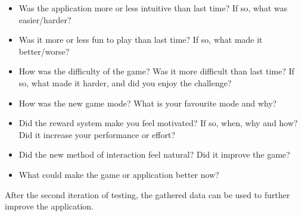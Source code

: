 \begin{itemize}
	\item Was the application more or less intuitive than last time? If so, what was easier/harder?
	\item Was it more or less fun to play than last time? If so, what made it better/worse?
	\item How was the difficulty of the game? Was it more difficult than last time? If so, what made it harder, and did you enjoy the challenge?
	\item How was the new game mode? What is your favourite mode and why?
	\item Did the reward system make you feel motivated? If so, when, why and how? Did it increase your performance or effort?
	\item Did the new method of interaction feel natural? Did it improve the game?
	\item What could make the game or application better now?
\end{itemize}

After the second iteration of testing, the gathered data can be used to further improve the application.